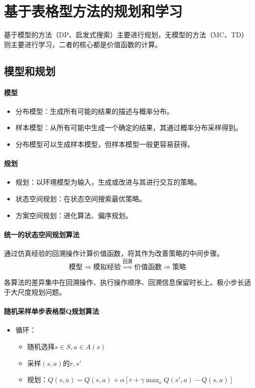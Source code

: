 \documentclass[
12pt, %
a4paper, 
oneside, %
headinclude,footinclude, %
]{scrartcl}
\begin{document}
\section{基于表格型方法的规划和学习}
基于模型的方法（DP、启发式搜索）主要进行规划，无模型的方法（MC、TD）则主要进行学习，二者的核心都是价值函数的计算。
\subsection{模型和规划}
\paragraph{模型}
\begin{itemize}
\item 分布模型：生成所有可能的结果的描述与概率分布。
\item 样本模型：从所有可能中生成一个确定的结果，其通过概率分布采样得到。
\item 分布模型可以生成样本模型，但样本模型一般更容易获得。
\end{itemize}
\paragraph{规划}
\begin{itemize}
\item 规划：以环境模型为输入，生成或改进与其进行交互的策略。
\item 状态空间规划：在状态空间搜索最优策略。
\item 方案空间规划：进化算法、偏序规划。
\end{itemize}
\paragraph{统一的状态空间规划算法}
通过仿真经验的回溯操作计算价值函数，将其作为改善策略的中间步骤。
$$ \text{模型} \Longrightarrow \text{模拟经验} \overset{\text{回溯}}{\Longrightarrow} \text{价值函数} \Longrightarrow \text{策略} $$

各算法的差异集中在回溯操作、执行操作顺序、回溯信息保留时长上。极小步长适于大尺度规划问题。
\paragraph{随机采样单步表格型Q规划算法}
\begin{itemize}
\item 循环：
\begin{itemize}
\item 随机选择$ s \in S, a \in A(s) $
\item 采样$ (s, a) $的$ r,s' $
\item 规划：$ Q(s, a) = Q(s, a) + \alpha[r + \gamma \max_aQ(s', a) - Q(s, a)] $
\end{itemize}
\end{itemize}
\end{document}
